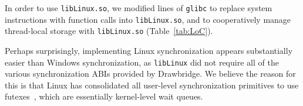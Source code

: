 \begin{comment}
Most {\tt libLinux.so} code reimplements
Linux kernel functionality.  We found it expedient to 
read the Linux source in order to understand its behavior and then reimplement 
that behavior on the \pal{} ABI in most cases.
In some cases, such as the file caching code,
we refactored code directly from the Linux kernel.
\end{comment}

In order to use {\tt libLinux.so}, we modified \libclines{} lines of {\tt glibc} to replace 
system instructions with function calls into {\tt lib\-Linux.so},
and to cooperatively manage thread-local storage with {\tt libLinux.so} (Table~\ref{tab:LoC}).




\begin{comment}
\vspace{5pt}
\noindent{\bf ABI Extensions.~}
\sysname{} extends the Drawbridge ABI with 9 additional \pal{} calls.
As discussed above, one creates a new sandbox, and 
5 additional calls were added for IPC.
We also add 3 calls to manage x86 segmentation registers
and exceptions (Bascule~\citep{baumann13bascule} adds
similar extensions).
\end{comment}

\vspace{5pt}
 Perhaps surprisingly, implementing Linux
synchronization appears substantially easier than Windows synchronization, 
as {\tt libLinux} did not require all of the various
synchronization ABIs provided by Drawbridge.
We believe the reason for this is that Linux has consolidated 
all user-level synchronization primitives to use futexes~\citep{franke02futex},
which are essentially kernel-level wait queues.

%


